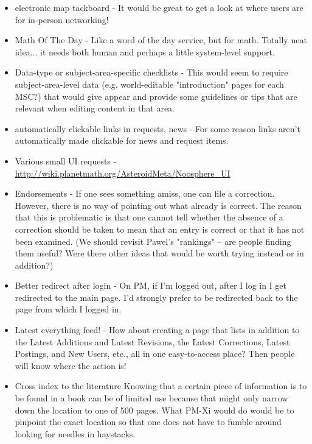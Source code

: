 \begin{itemize}
\item electronic map tackboard - It would be great to get a look at where users are for in-person networking! 

\item Math Of The Day - Like a word of the day service, but for math. Totally neat idea... it needs both human and perhaps a little system-level support. 

\item Data-type or subject-area-specific checklists - This would seem to require subject-area-level data (e.g. world-editable "introduction" pages for each MSC?) that would give appear and provide some guidelines or tips that are relevant when editing content in that area. 

\item automatically clickable links in requests, news - For some reason links aren't automatically made clickable for news and request items. 

\item Various small UI requests - \url{http://wiki.planetmath.org/AsteroidMeta/Noosphere_UI}

\item Endorsements - If one sees something amiss, one can file a correction. However, there is no way of pointing out what already is correct. The reason that this is problematic is that one cannot tell whether the absence of a correction should be taken to mean that an entry is correct or that it has not been examined. (We should revisit Pawel's "rankings" -- are people finding them useful? Were there other ideas that would be worth trying instead or in addition?) 

\item Better redirect after login - On PM, if I'm logged out, after I log in I get redirected to the main page. I'd strongly prefer to be redirected back to the page from which I logged in. 

\item Latest everything feed! - How about creating a page that lists in addition to the Latest Additions and Latest Revisions, the Latest Corrections, Latest Postings, and New Users, etc., all in one easy-to-access place? Then people will know where the action is! 

\item Cross index to the literature Knowing that a certain piece of information is to be found in a book can be of limited use because that might only narrow down the location to one of 500 pages. What PM-Xi would do would be to pinpoint the exact location so that one does not have to fumble around looking for needles in haystacks. 
\end{itemize}

